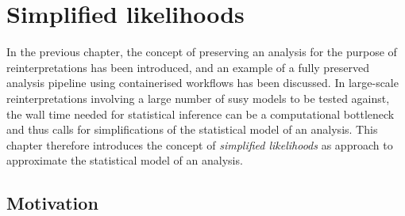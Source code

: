 


\chapter{Simplified likelihoods}\label{ch:simplify}

\ifpdf
    \graphicspath{{chapter-simplify/Figs/Raster/}{chapter-simplify/Figs/PDF/}{chapter-simplify/Figs/}}
\else
    \graphicspath{{chapter-simplify/Figs/Vector/}{chapter-simplify/Figs/}}
\fi

In the previous chapter, the concept of preserving an analysis for the purpose of reinterpretations has been introduced, and an example of a fully preserved analysis pipeline using containerised workflows has been discussed. In large-scale reinterpretations involving a large number of \gls{susy} models to be tested against, the wall time needed for statistical inference can be a computational bottleneck and thus calls for simplifications of the statistical model of an analysis. This chapter therefore introduces the concept of \textit{simplified likelihoods} as approach to approximate the statistical model of an analysis.

\section{Motivation}\label{sec:simplified_likelihood_motivation}


